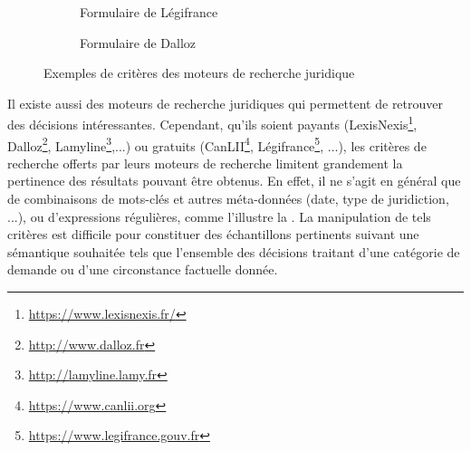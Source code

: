 \begin{figure}[!htb]
	\centering
	\begin{subfigure}[t]{\textwidth}
		\centering
		\caption{Formulaire de Légifrance}
	\end{subfigure}%

	\begin{subfigure}[t]{0.75\textwidth}
		\centering
		\caption{Formulaire de Dalloz}
	\end{subfigure}
	\caption{Exemples de critères des moteurs de recherche juridique}\label{fig:intro:juriSearchForm}
\end{figure}

Il existe aussi des moteurs de recherche juridiques qui permettent de retrouver des décisions intéressantes. Cependant, qu'ils soient payants (LexisNexis\footnote{\url{https://www.lexisnexis.fr/}}, Dalloz\footnote{\url{http://www.dalloz.fr}}, Lamyline\footnote{\url{http://lamyline.lamy.fr}},...) ou gratuits (CanLII\footnote{\url{https://www.canlii.org}}, Légifrance\footnote{\url{https://www.legifrance.gouv.fr}}, ...), les critères de recherche offerts par leurs moteurs de recherche limitent grandement la pertinence des résultats pouvant être obtenus. En effet, il ne s'agit en général que de combinaisons de mots-clés et autres méta-données (date, type de juridiction, ...), ou d'expressions régulières, comme l'illustre la . La manipulation de tels critères est difficile pour constituer des échantillons pertinents suivant une sémantique souhaitée tels que l'ensemble des décisions traitant d'une catégorie de demande ou d'une circonstance factuelle donnée. 

